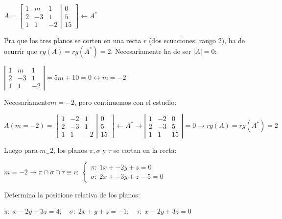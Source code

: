 \begin{proofw}\renewcommand{\qedsymbol}{$\diamond$}
	$A=\left[ \begin{matrix} 1&m&1\\2&-3&1\\1&1&-2 \end{matrix} \right. \left| \begin{matrix} 0\\5\\15 \end{matrix} \right] \leftarrow A^*$
	
\noindent Pra que los tres planos se corten en una recta $r$ (dos ecuaciones, rango $2$), ha de ocurrir que  $rg(A)=rg(A^*)=2$. Necesariamente ha de ser $|A|=0$:

\noindent $\left| \begin{matrix} 1&m&1\\2&-3&1\\1&1&-2 \end{matrix} \right|=5m+10=0 \leftrightarrow m=-2$

\noindent Necesariamente$m=-2$, pero continuemos con el estudio:

\noindent $A(m=-2)=\left[ \begin{matrix} \boxed{1}&\boxed{-2}&1\\\boxed{2}&\boxed{-3}&1\\1&1&-2 \end{matrix} \right. \left| \begin{matrix} 0\\5\\15 \end{matrix} \right] \leftarrow A^* \to 
\left| \begin{matrix} 1&-2&0\\2&-3&5\\1&1&15 \end{matrix} \right|=0 \to rg(A)=rg(A^*)=2$

\noindent Luego para $m_-2$, los planos $\pi, \sigma \text{ y } \tau$ se cortan en la recta: 

\noindent $m=-2 \to \pi \cap \sigma \cap \tau \equiv r:\; \begin{cases} \pi:\; \boxed{1}x+\boxed{-2}y+z=0 \\
 \sigma:\; \boxed{2}x+\boxed{-3}y+z-5=0 \end{cases}$

\end{proofw}


\begin{ejre}
	Determina la posicione relativa de los planos:
	
$\pi:\; x-2y+3z=4;\quad \sigma:\; 2x+y+z=-1;\quad \tau:\; x-2y+3z=0$	
\end{ejre}

